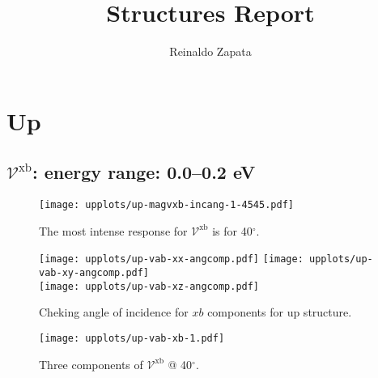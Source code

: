 \documentclass{article}
\title{Structures Report}
\author{Reinaldo Zapata}
\date{}
\let\Oldsection\section
\renewcommand{\section}{\FloatBarrier\Oldsection}
\let\Oldsubsection\subsection
\renewcommand{\subsection}{\FloatBarrier\Oldsubsection}
\begin{document}
\maketitle


\section{Up} %
\label{sec:up}


\subsection{$\mathcal{V}^{\mathrm{xb}} $: energy range: 0.0--0.2 eV }
\begin{figure}[h]
    \centering
    \texttt{[image: upplots/up-magvxb-incang-1-4545.pdf]}
    \caption{The most intense response for $\mathcal{V}^{\mathrm{xb}} $ is for 
    40$^{\circ}$.}
    \label{fig:up-magvxbincang1}
\end{figure}
\begin{figure}[h]
    \centering
    \texttt{[image: upplots/up-vab-xx-angcomp.pdf]}
    \texttt{[image: upplots/up-vab-xy-angcomp.pdf]}\\
    \texttt{[image: upplots/up-vab-xz-angcomp.pdf]}
    \caption{Cheking angle of incidence for $xb$ components for up structure.}
    \label{fig:up-xbangcomp}
\end{figure}
\begin{figure}[tb]
    \centering
    \texttt{[image: upplots/up-vab-xb-1.pdf]}
    \caption{Three components of $\mathcal{V}^{\mathrm{xb}} $ @ 40$^{\circ}$.}
    \label{fig:up-vxb1}
\end{figure}



\end{document}
